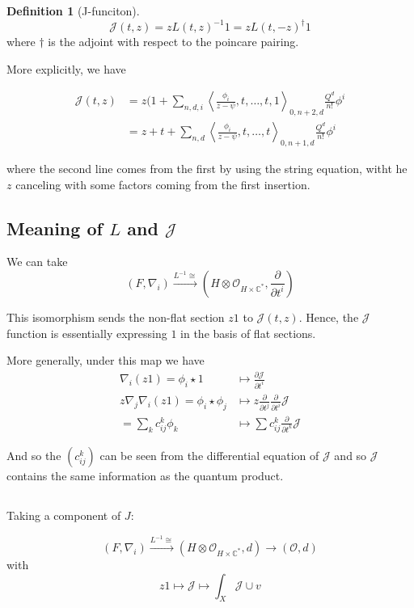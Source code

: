 \documentclass{amsart}
\theoremstyle{definition}
\newtheorem{definition}[dummy]{Definition}
\newcommand{\OO}{\mathcal{O}}
\newcommand{\J}{\mathcal{J}}
\newcommand{\C}{\mathbb{C}}
\newcommand{\one}{1}
\begin{document}
\begin{definition}[J-funciton]
$$\J(t,z)=zL(t,z)^{-1}\one=z L(t,-z)^\dagger \one$$
where $\dagger$ is the adjoint with respect to the poincare pairing.
\end{definition}


More explicitly, we have

\begin{align*}
\J(t,z)&=z(1+\sum_{n,d,i}\left\langle\frac{\phi_i}{z-\psi},t,\dots,t,\one\right\rangle_{0,n+2,d}\frac{Q^d}{n!} \phi^i \\
&=z+t+\sum_{n,d}\left\langle\frac{\phi_i}{z-\psi},t,\dots,t\right\rangle_{0,n+1,d}\frac{Q^d}{n!} \phi^i 
\end{align*}

where the second line comes from the first by using the string equation, witht he $z$ canceling with some factors coming from the first insertion.

\subsection{Meaning of $L$ and $\J$}

We can take $$(F,\nabla_i)\stackrel{L^{-1}\cong}\to \left(H\otimes\OO_{H\times\C^*},\frac{\partial}{\partial t^i}\right)$$

This isomorphism sends the non-flat section $z\one$ to $\J(t,z)$.  
Hence, the $\J$ function is essentially expressing $\one$ in the basis of flat sections.

More generally, under this map we have
\begin{align*}
\nabla_i(z\one)=\phi_i\star\one&\mapsto\frac{\partial\J}{\partial t^i} \\
z\nabla_j\nabla_i(z\one)=\phi_i\star\phi_j&\mapsto z\frac{\partial}{\partial t^j}\frac{\partial}{\partial t^i}\J \\
=\sum_k c_{ij}^k\phi_k & \mapsto \sum c^k_{ij} \frac{\partial}{\partial t^k}\J
\end{align*}

And so the $(c_{ij}^k)$ can be seen from the differential equation of $\J$ and so $\J$ contains the same information as the quantum product.
\subsection{}
Taking a component of $J$: 

$$(F,\nabla_i)\stackrel{L^{-1}\cong}\to (H\otimes\OO_{H\times\C^*},d)\to(\OO,d)$$
with
$$z\one\mapsto \J\mapsto \int_X\J\cup v$$
\end{document}
